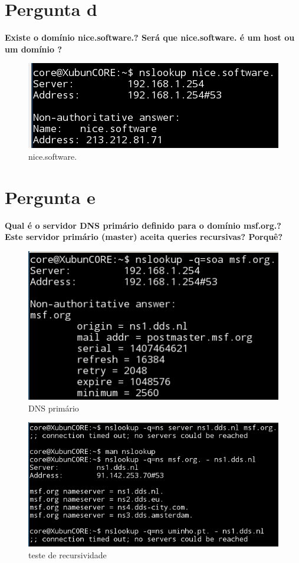 \documentclass[a4paper]{report}
\begin{document}
\section{Pergunta d}
\textbf{Existe o domínio nice.software.? Será que nice.software. é um host ou um
domínio ?}
\begin{figure}[H]
    \centering 
    \includegraphics[width=\textwidth]{images/nicesoftware.png}  
    \caption{nice.software.}
    \label{fig:nicesoftware}
\end{figure}

\section{Pergunta e}
\textbf{Qual é o servidor DNS primário definido para o domínio msf.org.? Este
servidor primário (master) aceita queries recursivas? Porquê?}
\begin{figure}[H]
    \centering 
    \includegraphics[width=\textwidth]{images/dnsprimario.png}  
    \caption{DNS primário}
    \label{fig:dnsprimario}
\end{figure}
\begin{figure}[H]
    \centering 
    \includegraphics[width=\textwidth]{images/recursivo.png}  
    \caption{teste de recursividade}
    \label{fig:recursivo}
\end{figure}
\end{document}
